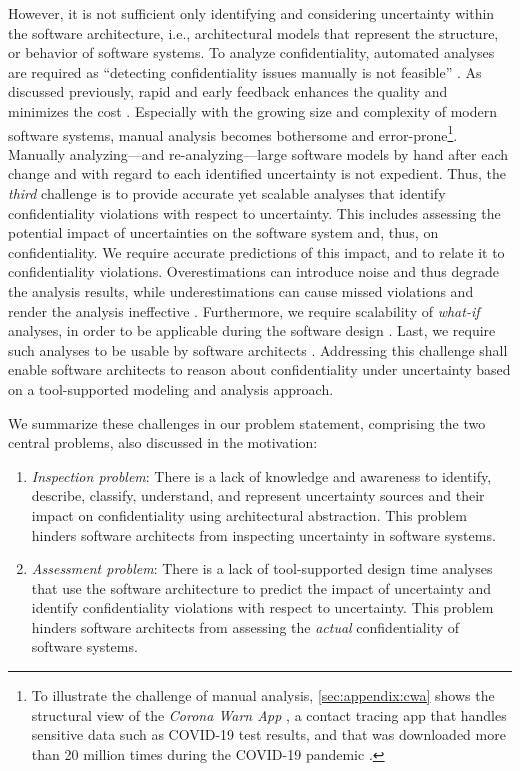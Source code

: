 However, it is not sufficient only identifying and considering uncertainty within the software architecture, i.e., architectural models that represent the structure, or behavior of software systems.
To analyze confidentiality, automated analyses are required as \enquote{detecting confidentiality issues manually is not feasible} \cite{seifermann_data-driven_2019}.
As discussed previously, rapid and early feedback enhances the quality and minimizes the cost \cite{reussner_modeling_2016}.
Especially with the growing size and complexity of modern software systems, manual analysis becomes bothersome and error-prone\footnote{To illustrate the challenge of manual analysis, \autoref{sec:appendix:cwa} shows the structural view of the \emph{Corona Warn App} \cite{sap_corona-warn-app_2023}, a contact tracing app that handles sensitive data such as COVID-19 test results, and that was downloaded more than 20 million times during the COVID-19 pandemic \cite{robert_koch_institute_open-source_2020}.}.
Manually analyzing---and re-analyzing---large software models by hand after each change and with regard to each identified uncertainty is not expedient.
Thus, the \emph{third} challenge is to provide accurate yet scalable analyses that identify confidentiality violations with respect to uncertainty.
This includes assessing the potential impact of uncertainties on the software system and, thus, on confidentiality.
We require accurate predictions of this impact, and to relate it to confidentiality violations.
Overestimations can introduce noise and thus degrade the analysis results, while underestimations can cause missed violations and render the analysis ineffective \cite{esfahani_uncertainty_2013}.
Furthermore, we require scalability of \emph{what-if} analyses, in order to be applicable during the software design \cite{koziolek_automated_2011}.
Last, we require such analyses to be usable by software architects \cite{sasse_usable_2005}.
Addressing this challenge shall enable software architects to reason about confidentiality under uncertainty based on a tool-supported modeling and analysis approach.

We summarize these challenges in our problem statement, comprising the two central problems, also discussed in the motivation:

\begin{enumerate}[label=\textbf{P\arabic*}]
    \item \emph{Inspection problem}\label{p:0:1}: There is a lack of knowledge and awareness to identify, describe, classify, understand, and represent uncertainty sources and their impact on confidentiality using architectural abstraction.
    This problem hinders software architects from inspecting uncertainty in software systems.
    \item \emph{Assessment problem}\label{p:0:2}: There is a lack of tool-supported design time analyses that use the software architecture to predict the impact of uncertainty and identify confidentiality violations with respect to uncertainty.
    This problem hinders software architects from assessing the \emph{actual} confidentiality of software systems.
\end{enumerate}

